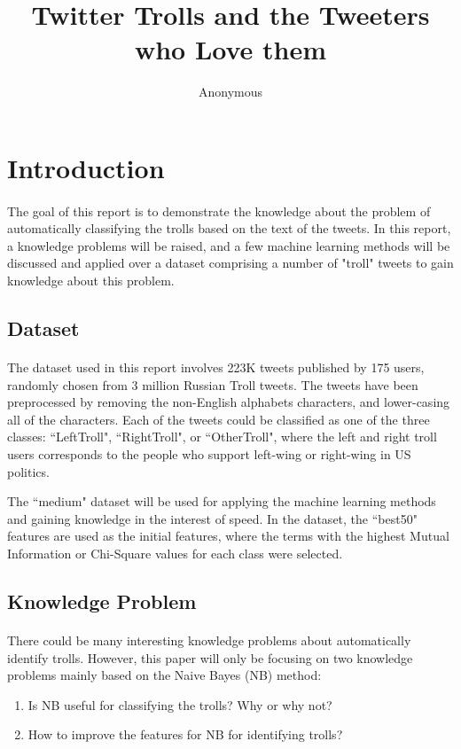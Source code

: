\documentclass[11pt]{article}
\title{Twitter Trolls and the Tweeters who Love them}
\author
{Anonymous}
\begin{document}
\maketitle

\section{Introduction}

\paragraph{}
The goal of this report is to demonstrate the knowledge about the problem of automatically classifying the trolls based on the text of the tweets. In this report, a knowledge problems will be raised, and a few machine learning methods will be discussed and applied over a dataset comprising a number of "troll" tweets to gain knowledge about this problem.

\subsection{Dataset}
\paragraph{}
The dataset used in this report involves 223K tweets published by 175 users, randomly chosen from 3 million Russian Troll tweets. The tweets have been preprocessed by removing the non-English alphabets characters, and lower-casing all of the characters. Each of the tweets could be classified as one of the three classes: ``LeftTroll", ``RightTroll", or ``OtherTroll", where the left and right troll users corresponds to the people who support left-wing or right-wing in US politics.

The ``medium" dataset will be used for applying the machine learning methods and gaining knowledge in the interest of speed. In the dataset, the ``best50" features are used as the initial features, where the terms with the highest Mutual Information or Chi-Square values for each class were selected.

\subsection{Knowledge Problem}

\paragraph{} There could be many interesting knowledge problems about automatically identify trolls. However, this paper will only be focusing on two knowledge problems mainly based on the Naive Bayes (NB) method:
\begin{enumerate}
\item
Is NB useful for classifying the trolls?  Why or why not?
\item
How to improve the features for NB for identifying trolls?
\end{enumerate}
\end{document}
